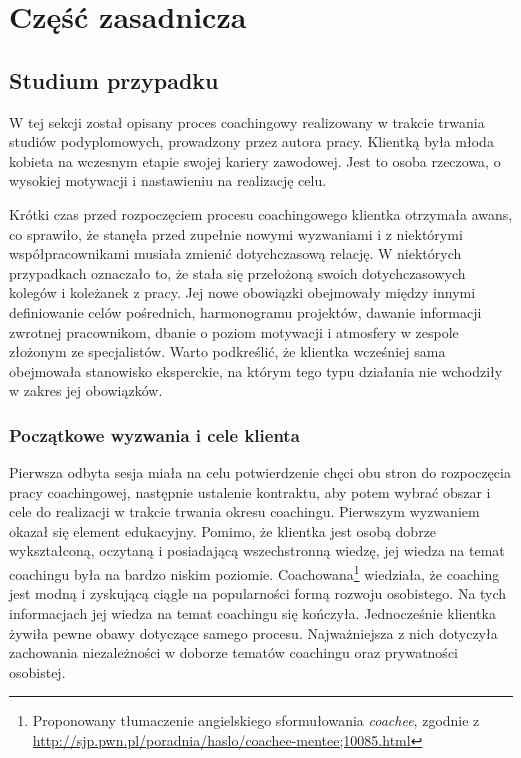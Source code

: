 
\chapter{Część zasadnicza}

\section{Studium przypadku}

W tej sekcji został opisany proces coachingowy realizowany w trakcie trwania studiów podyplomowych, prowadzony przez autora pracy. Klientką była
młoda kobieta na wczesnym etapie swojej kariery zawodowej. Jest to osoba rzeczowa, o wysokiej motywacji i nastawieniu na realizację celu.

Krótki czas przed rozpoczęciem procesu coachingowego klientka otrzymała awans, co sprawiło,
że stanęła przed zupełnie nowymi wyzwaniami i z niektórymi współpracownikami musiała zmienić dotychczasową relację. W niektórych przypadkach oznaczało
to, że stała się przełożoną swoich dotychczasowych kolegów i koleżanek z pracy. Jej nowe obowiązki obejmowały między innymi definiowanie celów pośrednich,
harmonogramu projektów, dawanie informacji zwrotnej pracownikom, dbanie o poziom motywacji i atmosfery w zespole złożonym ze specjalistów. Warto podkreślić,
że klientka wcześniej sama obejmowała stanowisko eksperckie, na którym tego typu działania nie wchodziły w zakres jej obowiązków.

\subsection{Początkowe wyzwania i cele klienta}

Pierwsza odbyta sesja miała na celu potwierdzenie chęci obu stron do rozpoczęcia pracy coachingowej, następnie ustalenie kontraktu, aby potem wybrać obszar
i cele do realizacji w trakcie trwania okresu coachingu. Pierwszym wyzwaniem okazał się element edukacyjny. Pomimo, że klientka jest osobą dobrze
wykształconą, oczytaną i posiadającą wszechstronną wiedzę, jej wiedza na temat coachingu była na bardzo niskim poziomie. Coachowana\footnote{Proponowany
tłumaczenie angielskiego sformułowania \emph{coachee}, zgodnie z \url{http://sjp.pwn.pl/poradnia/haslo/coachee-mentee;10085.html}} wiedziała, że coaching
jest modną i zyskującą ciągle na popularności formą rozwoju osobistego. Na tych informacjach jej wiedza na temat coachingu się kończyła. Jednocześnie
klientka żywiła pewne obawy dotyczące samego procesu. Najważniejsza z nich dotyczyła zachowania niezależności w doborze tematów coachingu oraz prywatności
osobistej.

